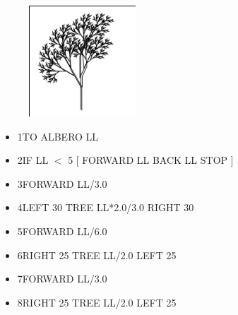 \begin{minipage}{0.2\textwidth}
\begin{figure}[H]
   \includegraphics[width=4.0cm,trim=4 4 8 4,clip]{./images/magia-specchi/albero-meglio.png}
   \label{tree-3}
\end{figure}
\end{minipage} \hfill
\begin{minipage}{0.8\textwidth}
\begin{itemize}[itemsep=-3pt,parsep=2pt]
\item[] \hspace{0.5cm}  1\hspace{8pt}TO ALBERO LL           
\item[] \hspace{0.5cm}  2\hspace{8pt}\hspace{8pt}IF LL $<$ 5 [ FORWARD LL BACK LL STOP ]
\item[] \hspace{0.5cm}  3\hspace{8pt}\hspace{8pt}FORWARD LL/3.0
\item[] \hspace{0.5cm}  4\hspace{8pt}\hspace{8pt}LEFT 30 TREE LL*2.0/3.0 RIGHT 30
\item[] \hspace{0.5cm}  5\hspace{8pt}\hspace{8pt}FORWARD LL/6.0
\item[] \hspace{0.5cm}  6\hspace{8pt}\hspace{8pt}RIGHT 25 TREE LL/2.0 LEFT 25
\item[] \hspace{0.5cm}  7\hspace{8pt}\hspace{8pt}FORWARD LL/3.0
\item[] \hspace{0.5cm}  8\hspace{8pt}\hspace{8pt}RIGHT 25 TREE LL/2.0 LEFT 25

\end{itemize}
\end{minipage}
